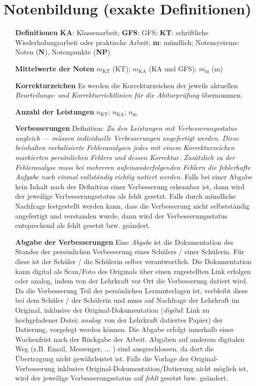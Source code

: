\section{Notenbildung (exakte Definitionen)}

\begin{enumerate}[label=\textbf{\textbullet}, align=left, leftmargin=*]
	\item[\textbf{Definitionen}] { \scriptsize \textbf{KA}: Klassenarbeit; \textbf{GFS}: GFS; \textbf{KT}: schriftliche Wiederholungsarbeit oder praktische Arbeit; \textbf{m}: mündlich; Notensysteme: Noten (\textbf{N}), Notenpunkte (\textbf{NP}) }
	\item[\textbf{Mittelwerte der Noten}] $\overline{m_{\mathrm{KT}}}$ (KT); $\overline{m_{\mathrm{KA}}}$ (KA und GFS); $\overline{m_{\mathrm{m}}}$ (m)
	\item[\textbf{Korrekturzeichen}] Es werden die Korrekturzeichen der jeweils aktuellen \textit{\glqq Beurteilungs- und Korrekturrichtlinien für die Abiturprüfung\grqq{}} übernommen.
	\item[\textbf{Anzahl der Leistungen}] $n_{\mathrm{KT}}$; $n_{\mathrm{KA}}$; $n_{\mathrm{m}}$
	\item[\textbf{Verbesserungen}] { \scriptsize Definition: \glqq\textit{Zu den Leistungen mit Verbesserungsstatus ungleich \glqq ---\grqq{} müssen \textit{individuelle} Verbesserungen angefertigt werden. Diese beinhalten verbalisierte Fehleranalysen jedes mit einem Korrekturzeichen markierten \textit{persönlichen} Fehlers und dessen Korrektur. Zusätzlich zu der Fehleranalyse muss bei mehreren aufeinanderfolgenden Fehlern die fehlerhafte Aufgabe noch einmal vollständig richtig notiert werden.}\grqq{} Falls bei einer Abgabe kein Inhalt nach der Definition einer Verbesserung erkennbar ist, dann wird der jeweilige Verbesserungsstatus als \glqq fehlt\grqq{} gesetzt.  Falls durch mündliche Nachfrage festgestellt werden kann, dass die Verbesserung nicht selbstständig angefertigt und verstanden wurde, dann wird der Verbesserungsstatus entsprechend als \glqq fehlt\grqq{} gesetzt bzw. geändert.}
	\item[\textbf{Abgabe der Verbesserungen}] { \scriptsize Eine \glqq \textit{Abgabe}\grqq{} ist die Dokumentation des Standes der persönlichen Verbesserung eines Schülers / einer Schülerin. Für diese ist der Schüler / die Schülerin selber verantwortlich. Die Dokumentation kann digital als Scan/Foto des Originals über einen zugestellten Link erfolgen oder analog, indem von der Lehrkraft vor Ort die Verbesserung datiert wird. Da die Verbesserung Teil der persönlichen Lernunterlagen ist, verbleibt diese bei dem Schüler / der Schülerin und muss auf Nachfrage der Lehrkraft im Original, inklusive der Original-Dokumentation (\textit{digital}: Link zu hochgeladener Datei; \textit{analog}: von der Lehrkraft datiertes Papier) der Datierung, vorgelegt werden können. Die Abgabe erfolgt innerhalb einer Wochenfrist nach der Rückgabe der Arbeit. Abgaben auf anderem digitalen Weg (z.B. Email, Messenger, ... ) sind ausgeschlossen, da dort die Übertragung nicht gewährleistet ist. Falls die Vorlage der Original-Verbesserung inklusive Original-Dokumentation/Datierung nicht möglich ist, wird der jeweilige Verbesserungsstatus auf \glqq \textit{fehlt}\grqq{} gesetzt bzw. geändert.} 

\end{enumerate}
